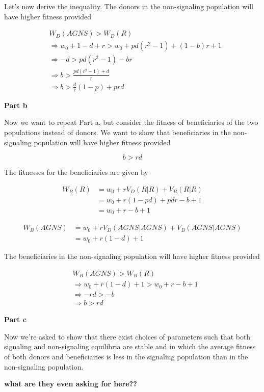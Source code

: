 \documentclass{article}
\begin{document}
Let's now derive the inequality. The donors in the non-signaling
population will have higher fitness provided

\begin{align*}
    &W_D(AGNS) > W_D(R) \\
    &\Rightarrow w_0 + 1 - d + r > w_0 + p d (r^2 - 1) + (1 - b) r + 1 \\
    &\Rightarrow - d > p d (r^2 - 1) - b r \\
    &\Rightarrow b > \frac{p d (r^2 - 1) + d}{r} \\
    &\Rightarrow b > \frac{d}{r} (1 - p) + p r d
\end{align*}

\textbf{Part b}

Now we want to repeat Part a, but consider the fitness of beneficiaries
of the two populations instead of donors. We want to show that
beneficiaries in the non-signaling population will have higher fitness
provided

\begin{equation*}
    b > r d
\end{equation*}

The fitnesses for the beneficiaries are given by

\begin{align*}
    W_B(R) &= w_0 + r V_D(R|R) + V_B(R|R) \\
           &= w_0 + r (1 - p d) + p d r - b + 1 \\
           &= w_0 + r - b + 1
\end{align*}

\begin{align*}
    W_B(AGNS) &= w_0 + r V_D(AGNS|AGNS) + V_B(AGNS|AGNS) \\
              &= w_0 + r (1 - d) + 1
\end{align*}

The beneficiaries in the non-signaling population will have higher
fitness provided

\begin{align*}
    &W_B(AGNS) > W_B(R) \\
    &\Rightarrow w_0 + r (1 - d) + 1 > w_0 + r - b + 1 \\
    &\Rightarrow - r d > - b \\
    &\Rightarrow b > r d
\end{align*}

\textbf{Part c}

Now we're asked to show that there exist choices of parameters such that
both signaling and non-signaling equilibria are stable and in which the
average fitness of both donors and beneficiaries is less in the
signaling population than in the non-signaling population.

\textbf{what are they even asking for here??}
\end{document}
